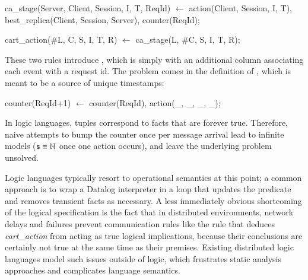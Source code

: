 \begin{Dedalus}
ca_stage(Server, Client, Session, I, T, ReqId) \(\leftarrow\)
  action(Client, Session, I, T),
  best_replica(Client, Session, Server),
  counter(ReqId);

cart_action(#L, C, S, I, T, R) \(\leftarrow\)
  ca_stage(L, #C, S, I, T, R);
\end{Dedalus}

These two rules introduce , which is simply
 with an additional column associating each event with
a request id.  The problem comes in the definition of
, which is meant to be a source of unique timestamps:

\begin{Dedalus}
counter(ReqId+1) \(\leftarrow\) counter(ReqId),
                    action(_, _, _, _);
\end{Dedalus}

In logic languages, tuples correspond to facts that are forever true.
Therefore, naive attempts to bump the counter once per message arrival
lead to infinite models ($\dedalus{s} \equiv \mathbb{N}$ once one
action occurs), and leave the underlying problem unsolved.

Logic languages typically resort to operational semantics
at this point; a common approach is to wrap a Datalog interpreter in
a  loop that updates the 
predicate and removes transient facts as necessary.
A less immediately obvious shortcoming of the logical specification is the 
fact that in distributed environments, network delays
and failures prevent communication rules like the rule that deduces {\em cart\_action}
from acting as true logical
implications, because their conclusions are certainly not true at the same time
as their premises.
Existing distributed logic languages model such issues
outside of logic, which frustrates static analysis approaches and
complicates language semantics.  



